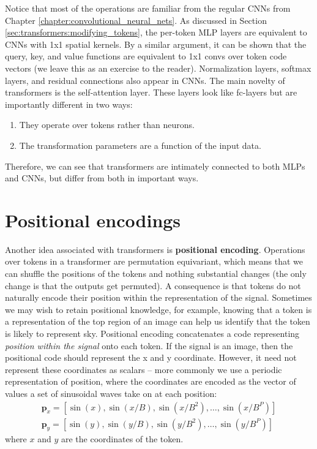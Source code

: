 Notice that most of the operations are familiar from the regular CNNs from Chapter \ref{chapter:convolutional_neural_nets}. As discussed in Section \ref{sec:transformers:modifying_tokens}, the per-token MLP layers are equivalent to CNNs with 1x1 spatial kernels. By a similar argument, it can be shown that the query, key, and value functions are equivalent to 1x1 convs over token code vectors (we leave this as an exercise to the reader). Normalization layers, softmax layers, and residual connections also appear in CNNs. The main novelty of transformers is the self-attention layer. These layers look like fc-layers but are importantly different in two ways:
\begin{enumerate}
    \item They operate over tokens rather than neurons.
    \item The transformation parameters are a function of the input data.
\end{enumerate}

Therefore, we can see that transformers are intimately connected to both MLPs and CNNs, but differ from both in important ways.

\section{Positional encodings}\label{sec:transformers:positional_encodings}
Another idea associated with transformers is {\bf positional encoding}. Operations over tokens in a transformer are permutation equivariant, which means that we can shuffle the positions of the tokens and nothing substantial changes (the only change is that the outputs get permuted). A consequence is that tokens do not naturally encode their position within the representation of the signal. Sometimes we may wish to retain positional knowledge, for example, knowing that a token is a representation of the top region of an image can help us identify that the token is likely to represent sky. Positional encoding concatenates a code representing \textit{position within the signal} onto each token. If the signal is an image, then the positional code should represent the x and y coordinate. However, it need not represent these coordinates as scalars -- more commonly we use a periodic representation of position, where the coordinates are encoded as the vector of values a set of sinusoidal waves take on at each position:
\begin{align}
    \mathbf{p}_x = [\sin(x), \sin(x/B), \sin(x/B^2), \ldots, \sin(x/B^P)]\\
    \mathbf{p}_y = [\sin(y), \sin(y/B), \sin(y/B^2), \ldots, \sin(y/B^P)]
\end{align}
where $x$ and $y$ are the coordinates of the token.

